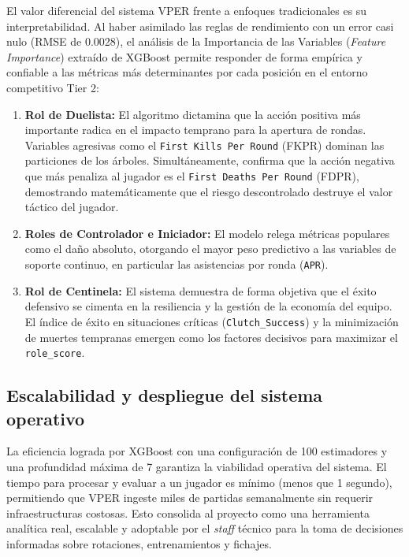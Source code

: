 \documentclass{ULBreport} %
\begin{document}
\begin{itemize}
El valor diferencial del sistema VPER frente a enfoques tradicionales es su interpretabilidad. Al haber asimilado las reglas de rendimiento con un error casi nulo (RMSE de 0.0028), el análisis de la Importancia de las Variables (\textit{Feature Importance}) extraído de XGBoost permite responder de forma empírica y confiable a las métricas más determinantes por cada posición en el entorno competitivo Tier 2:

\begin{enumerate}
    \item \textbf{Rol de Duelista:} El algoritmo dictamina que la acción positiva más importante radica en el impacto temprano para la apertura de rondas. Variables agresivas como el \texttt{First Kills Per Round} (FKPR) dominan las particiones de los árboles. Simultáneamente, confirma que la acción negativa que más penaliza al jugador es el \texttt{First Deaths Per Round} (FDPR), demostrando matemáticamente que el riesgo descontrolado destruye el valor táctico del jugador.
    \item \textbf{Roles de Controlador e Iniciador:} El modelo relega métricas populares como el daño absoluto, otorgando el mayor peso predictivo a las variables de soporte continuo, en particular las asistencias por ronda (\texttt{APR}).
    \item \textbf{Rol de Centinela:} El sistema demuestra de forma objetiva que el éxito defensivo se cimenta en la resiliencia y la gestión de la economía del equipo. El índice de éxito en situaciones críticas (\texttt{Clutch\_Success}) y la minimización de muertes tempranas emergen como los factores decisivos para maximizar el \texttt{role\_score}.
\end{enumerate}

\subsection{Escalabilidad y despliegue del sistema operativo}

La eficiencia lograda por XGBoost con una configuración de 100 estimadores y una profundidad máxima de 7 garantiza la viabilidad operativa del sistema. El tiempo para procesar y evaluar a un jugador es mínimo (menos que 1 segundo), permitiendo que VPER ingeste miles de partidas semanalmente sin requerir infraestructuras costosas. Esto consolida al proyecto como una herramienta analítica real, escalable y adoptable por el \textit{staff} técnico para la toma de decisiones informadas sobre rotaciones, entrenamientos y fichajes.
    
\end{itemize}
\end{document}
